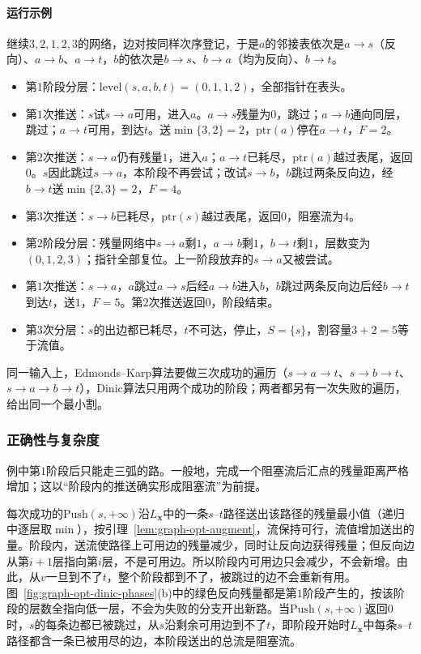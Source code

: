 \paragraph{运行示例}
继续$3,2,1,2,3$的网络，边对按同样次序登记，于是$a$的邻接表依次是$a\to s$（反向）、$a\to b$、$a\to t$，$b$的依次是$b\to s$、$b\to a$（均为反向）、$b\to t$。
\begin{itemize}
  \item 第$1$阶段分层：$\mathrm{level}(s,a,b,t)=(0,1,1,2)$，全部指针在表头。
  \item 第$1$次推送：$s$试$s\to a$可用，进入$a$。$a\to s$残量为$0$，跳过；$a\to b$通向同层，跳过；$a\to t$可用，到达$t$。送$\min\{3,2\}=2$，$\mathrm{ptr}(a)$停在$a\to t$，$F=2$。
  \item 第$2$次推送：$s\to a$仍有残量$1$，进入$a$；$a\to t$已耗尽，$\mathrm{ptr}(a)$越过表尾，返回$0$。$s$因此跳过$s\to a$，本阶段不再尝试；改试$s\to b$，$b$跳过两条反向边，经$b\to t$送$\min\{2,3\}=2$，$F=4$。
  \item 第$3$次推送：$s\to b$已耗尽，$\mathrm{ptr}(s)$越过表尾，返回$0$，阻塞流为$4$。
  \item 第$2$阶段分层：残量网络中$s\to a$剩$1$，$a\to b$剩$1$，$b\to t$剩$1$，层数变为$(0,1,2,3)$；指针全部复位。上一阶段放弃的$s\to a$又被尝试。
  \item 第$1$次推送：$s\to a$，$a$跳过$a\to s$后经$a\to b$进入$b$，$b$跳过两条反向边后经$b\to t$到达$t$，送$1$，$F=5$。第$2$次推送返回$0$，阶段结束。
  \item 第$3$次分层：$s$的出边都已耗尽，$t$不可达，停止，$S=\{s\}$，割容量$3+2=5$等于流值。
\end{itemize}
同一输入上，Edmonds--Karp算法要做三次成功的遍历（$s\to a\to t$、$s\to b\to t$、$s\to a\to b\to t$），Dinic算法只用两个成功的阶段；两者都另有一次失败的遍历，给出同一个最小割。

\subsubsection{正确性与复杂度}

例中第$1$阶段后只能走三弧的路。一般地，完成一个阻塞流后汇点的残量距离严格增加；这以“阶段内的推送确实形成阻塞流”为前提。

每次成功的$\mathrm{Push}(s,+\infty)$沿$L_{\bm x}$中的一条$s$--$t$路径送出该路径的残量最小值（递归中逐层取$\min$），按引理~\ref{lem:graph-opt-augment}，流保持可行，流值增加送出的量。阶段内，送流使路径上可用边的残量减少，同时让反向边获得残量；但反向边从第$i+1$层指向第$i$层，不是可用边。所以阶段内可用边只会减少，不会新增。由此，从$v$一旦到不了$t$，整个阶段都到不了，被跳过的边不会重新有用。图~\ref{fig:graph-opt-dinic-phases}(b)中的绿色反向残量都是第$1$阶段产生的，按该阶段的层数全指向低一层，不会为失败的分支开出新路。当$\mathrm{Push}(s,+\infty)$返回$0$时，$s$的每条边都已被跳过，从$s$沿剩余可用边到不了$t$，即阶段开始时$L_{\bm x}$中每条$s$--$t$路径都含一条已被用尽的边，本阶段送出的总流是阻塞流。

